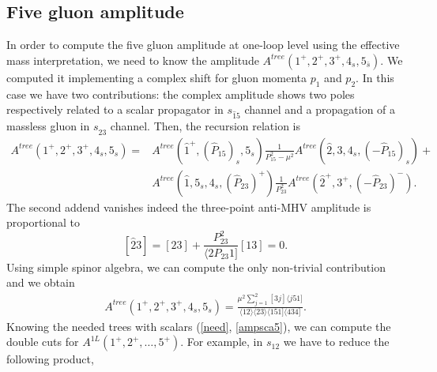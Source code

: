 \subsection{Five gluon amplitude}
In order to compute the five gluon amplitude at one-loop level using the effective mass interpretation, we need to know the amplitude $A^{tree}(1^+,2^+,3^+,4_s,5_{\bar s})$. We computed it  implementing a complex shift for gluon momenta $p_1$ and $p_2$. In this case we have two contributions: the complex amplitude shows two poles respectively related to a scalar propagator in $s_{\hat 1 5}$ channel and a propagation of a massless gluon in $s_{\hat 23}$ channel. Then, the recursion relation is
\begin{align*}
	A^{tree}(1^+,2^+,3^+,4_s,5_{ s})=&A^{tree}(\hat 1^+,(\hat P_{15})_s, 5_{ s})\frac{1}{P_{15}^2-\mu^2} A^{tree}(\hat 2, 3, 4_s,  (-\hat P_{15})_s)+\\
	&A^{tree}(\hat 1, 5_s, 4_s, (\hat P_{23})^+)\frac{1}{P_{23}^2} A^{tree}(\hat 2^+, 3^+, (-\hat P_{23})^-).
\end{align*}
The second addend vanishes indeed the three-point anti-MHV amplitude is proportional to
$$
	[\hat 2 3]=[23]+\frac{P_{23}^2}{\langle 2 P_{23} 1]}[13]=0.
$$
Using simple spinor algebra, we can compute the only non-trivial contribution and we obtain 
\begin{align}
	A^{tree}(1^+,2^+,3^+,4_s,5_{ s})=\frac{\mu^2 \sum_{j=1}^2 [3j]\langle j 5 1]}{\langle 12 \rangle \langle 23 \rangle \langle 1 5 1]\langle 4 3 4]}.	\label{ampsca5}
\end{align}
Knowing the needed trees with scalars (\ref{need}, \ref{ampsca5}), we can compute the double cuts for $A^{1L}(1^+,2^+,\dots,5^+)$. For example, in $s_{12}$ we have to reduce the following product,
